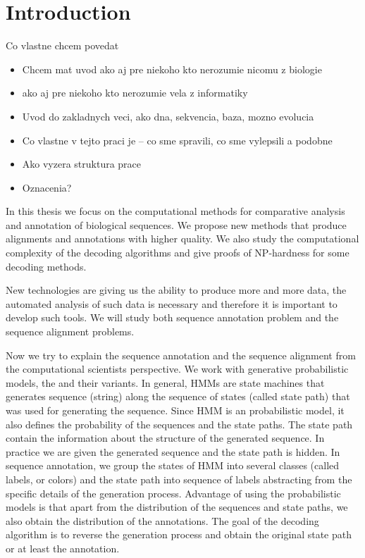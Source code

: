 \chapter{Introduction}

\begin{reformulate*}
Co vlastne chcem povedat
\begin{itemize}[itemsep=-1mm]
\item Chcem mat uvod ako aj pre niekoho kto nerozumie nicomu z biologie
\item ako aj pre niekoho kto nerozumie vela z informatiky
\item Uvod do zakladnych veci, ako dna, sekvencia, baza, mozno evolucia
\item Co vlastne v tejto praci je -- co sme spravili, co sme vylepsili a podobne
\item Ako vyzera struktura prace
\item Oznacenia?
\end{itemize}
\end{reformulate*}

In this thesis we focus on the computational methods for comparative analysis
and annotation of biological sequences. We propose new methods that produce
alignments and annotations with higher quality. We also study the computational
complexity of the decoding algorithms and give proofs of NP-hardness for some
decoding methods. 

New technologies are giving us the ability to produce more and more data, the
automated analysis of such data is necessary and therefore it is important to
develop such tools. We will study both sequence annotation problem and the
sequence alignment problems. 

Now we try to explain the sequence annotation and the sequence alignment from
the computational scientists perspective. We work with generative probabilistic
models, the  and their variants. In
general, HMMs are state machines that generates sequence (string) along the
sequence of states (called state path) that was used for generating the
sequence. Since HMM is an probabilistic model, it also defines the probability
of the sequences and the state paths. The state path contain the information
about the structure of the generated sequence. In practice we are given the
generated sequence and the state path is hidden. In sequence annotation, we
group the states of HMM into several classes (called labels, or colors) and the
state path into sequence of labels abstracting from the specific details of the
generation process. Advantage of using the probabilistic models is that apart
from the distribution of the sequences and state paths, we also obtain the
distribution of the annotations. The goal of the decoding algorithm is to
reverse the generation process and obtain the original state path or at least
the annotation. 

